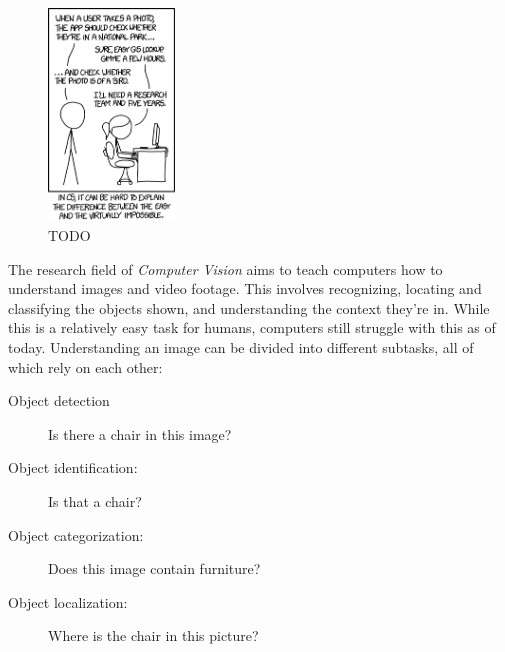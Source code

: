 \documentclass[twoside,a4paper]{article}
\begin{document}
\begin{figure}[h!]
\centering
    \includegraphics[width=0.3\textwidth]{images/xkcd}
\caption{TODO}
\label{fig:xkcd}
\end{figure}



The research field of \emph{Computer Vision} aims to teach computers how to understand images and video footage. This involves recognizing, locating and classifying the objects shown, and understanding the context they're in.
While this is a relatively easy task for humans, computers still struggle with this as of today. Understanding an image can be divided into different subtasks, all of which rely on each other:
\begin{description}
\item[Object detection] Is there a chair in this image?
\item[Object identification:] Is that a chair?
\item[Object categorization:] Does this image contain furniture?
\item[Object localization:] Where is the chair in this picture?
\end{description}
\end{document}
